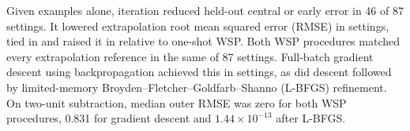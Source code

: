 Given examples alone, iteration reduced held-out central or early error in 46 of 87 settings. It lowered extrapolation root mean squared error (RMSE) in \iterBetterE{} settings, tied in \iterTieE{} and raised it in \iterWorseE{} relative to one-shot WSP. Both WSP procedures matched every extrapolation reference in the same \iterPerfectE{} of 87 settings. Full-batch gradient descent using backpropagation achieved this in \perfectGD{} settings, as did descent followed by limited-memory Broyden--Fletcher--Goldfarb--Shanno (L-BFGS) refinement. On two-unit subtraction, median outer RMSE was zero for both WSP procedures, 0.831 for gradient descent and $1.44\times10^{-13}$ after L-BFGS.
